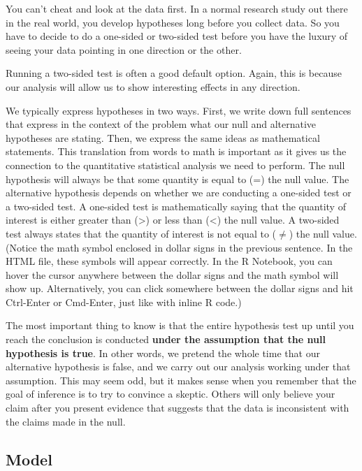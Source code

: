 \documentclass[
]{book}
\begin{document}
You can't cheat and look at the data first. In a normal research study out there in the real world, you develop hypotheses long before you collect data. So you have to decide to do a one-sided or two-sided test before you have the luxury of seeing your data pointing in one direction or the other.

Running a two-sided test is often a good default option. Again, this is because our analysis will allow us to show interesting effects in any direction.

We typically express hypotheses in two ways. First, we write down full sentences that express in the context of the problem what our null and alternative hypotheses are stating. Then, we express the same ideas as mathematical statements. This translation from words to math is important as it gives us the connection to the quantitative statistical analysis we need to perform. The null hypothesis will always be that some quantity is equal to (=) the null value. The alternative hypothesis depends on whether we are conducting a one-sided test or a two-sided test. A one-sided test is mathematically saying that the quantity of interest is either greater than (\textgreater) or less than (\textless) the null value. A two-sided test always states that the quantity of interest is not equal to (\(\neq\)) the null value. (Notice the math symbol enclosed in dollar signs in the previous sentence. In the HTML file, these symbols will appear correctly. In the R Notebook, you can hover the cursor anywhere between the dollar signs and the math symbol will show up. Alternatively, you can click somewhere between the dollar signs and hit Ctrl-Enter or Cmd-Enter, just like with inline R code.)

The most important thing to know is that the entire hypothesis test up until you reach the conclusion is conducted \textbf{under the assumption that the null hypothesis is true}. In other words, we pretend the whole time that our alternative hypothesis is false, and we carry out our analysis working under that assumption. This may seem odd, but it makes sense when you remember that the goal of inference is to try to convince a skeptic. Others will only believe your claim after you present evidence that suggests that the data is inconsistent with the claims made in the null.

\hypertarget{hypothesis1-model}{%
\subsection{Model}\label{hypothesis1-model}}
\end{document}
